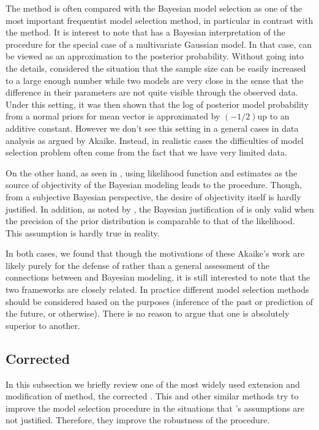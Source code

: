 The \aic method is often compared with the Bayesian model selection as one of
the most important frequentist model selection method, in particular in
contrast with the \bic method. It is interest to note that
\textcite{Akaike1978} has a Bayesian interpretation of the \aic procedure for
the special case of a multivariate Gaussian model. In that case, \aic can be
viewed as an approximation to the posterior probability. Without going into
the details, \textcite{Akaike1978} considered the situation that the sample
size can be easily increased to a large enough number while two models are
very close in the sense that the difference in their parameters are not quite
visible through the observed data. Under this setting, it was then shown that
the log of posterior model probability from a normal priors for mean vector is
approximated by $(-1/2)$\aic up to an additive constant. However we don't see
this setting in a general cases in data analysis as argued by Akaike. Instead,
in realistic cases the difficulties of model selection problem often come from
the fact that we have very limited data.

On the other hand, as seen in \textcite{Akaike1980}, using likelihood function
and \aic estimates as the source of objectivity of the Bayesian modeling leads
to the \bic procedure. Though, from a subjective Bayesian perspective, the
desire of objectivity itself is hardly justified. In addition, as noted by
\textcite{Kass1995}, the Bayesian justification of \aic is only valid when the
precision of the prior distribution is comparable to that of the likelihood.
This assumption is hardly true in reality.

In both cases, we found that though the motivations of these Akaike's work are
likely purely for the defense of \aic rather than a general assessment of the
connections between \aic and Bayesian modeling, it is still interested to note
that the two frameworks are closely related. In practice different model
selection methods should be considered based on the purposes (inference of the
past or prediction of the future, or otherwise). There is no reason to argue
that one is absolutely superior to another.

\subsection{Corrected \protect\aic}
\label{sub:Corrected aic}

In this subsection we briefly review one of the most widely used extension and
modification of \aic method, the corrected \aic. This and other similar
methods try to improve the model selection procedure in the situations that
\textcite{Akaike1973}'s assumptions are not justified. Therefore, they improve
the robustness of the \aic procedure.

